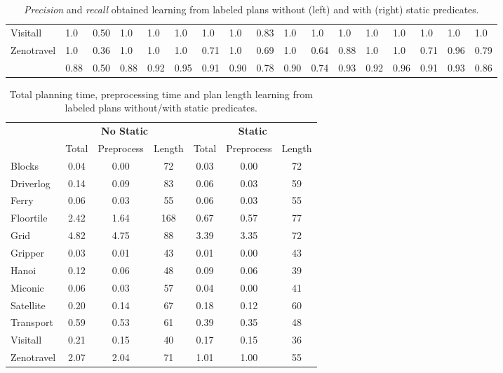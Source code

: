 \documentclass[letterpaper]{article} %
\begin{document}
\begin{table*}
{\begin{tabular}{l|l|l|l|l|l|l||l|l||l|l|l|l|l|l||l|l|}
			Visitall & 1.0 & 0.50 & 1.0 & 1.0 & 1.0 & 1.0 & 1.0 & 0.83 & 1.0 & 1.0 & 1.0 & 1.0 & 1.0 & 1.0 & 1.0 & 1.0\\
			Zenotravel & 1.0 & 0.36 & 1.0 & 1.0 & 1.0 & 0.71 & 1.0 & 0.69 &1.0 & 0.64 & 0.88 & 1.0 & 1.0 & 0.71 & 0.96 & 0.79\\
			\hline
			\bf  & 0.88 & 0.50 & 0.88 & 0.92 & 0.95 & 0.91 & 0.90 & 0.78 & 0.90 & 0.74 & 0.93 & 0.92 & 0.96 & 0.91 & 0.93 & 0.86\\
		\end{tabular}
	}
\caption{\small {\em Precision} and {\em recall} obtained learning from labeled plans without (left) and with (right) static predicates.}
\label{tab:results_plans}
\end{table*}

\begin{table}
\begin{scriptsize}
	\begin{center}
		\begin{tabular}{l|c|c|c||c|c|c|}
                         & \multicolumn{3}{|c||}{\bf No Static}& \multicolumn{3}{|c|}{\bf Static}\\
			 & Total & Preprocess & Length  & Total & Preprocess &  Length\\
                         \hline
			Blocks & 0.04 & 0.00 & 72  & 0.03 & 0.00 & 72 \\
			Driverlog & 0.14 & 0.09 & 83 & 0.06 & 0.03 & 59 \\
			Ferry & 0.06 & 0.03 & 55 & 0.06 & 0.03 & 55 \\
			Floortile & 2.42 & 1.64 & 168 & 0.67 & 0.57 & 77 \\
			Grid & 4.82 & 4.75 & 88 & 3.39 & 3.35 & 72 \\
			Gripper & 0.03 & 0.01 & 43 & 0.01 & 0.00 & 43 \\
                        Hanoi & 0.12 & 0.06 & 48 & 0.09 & 0.06 & 39 \\
                        Miconic & 0.06 & 0.03 & 57 & 0.04 & 0.00 & 41 \\
			Satellite & 0.20 & 0.14 & 67 & 0.18 & 0.12 & 60 \\
			Transport & 0.59 & 0.53 & 61 & 0.39 & 0.35 & 48 \\
			Visitall & 0.21 & 0.15 & 40 & 0.17 & 0.15 & 36 \\
			Zenotravel & 2.07 & 2.04 & 71 & 1.01 & 1.00 & 55 \\			
		\end{tabular}
	\end{center}
        \end{scriptsize}
	\caption{\small Total planning time, preprocessing time and plan length learning from labeled plans without/with static predicates.}
	\label{tab:time_plans}	
\end{table}
\end{document}
